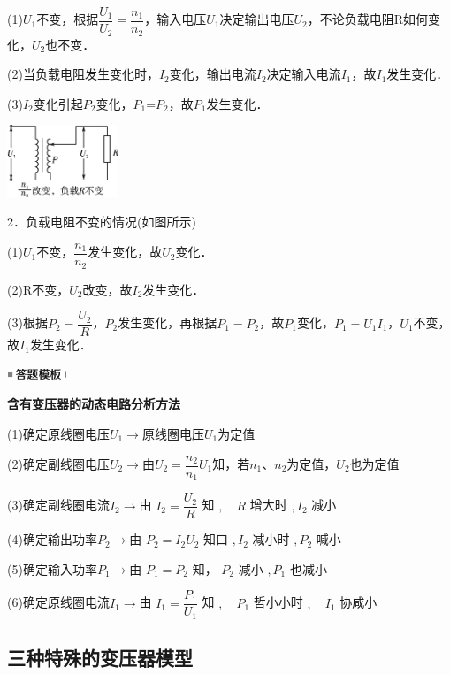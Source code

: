 (1)$U_1$不变，根据$\dfrac{U_{1}}{U_{2}}=\dfrac{n_{1}}{n_{2}}$，输入电压$U_1$决定输出电压$U_2$，不论负载电阻R如何变化，$U_2$也不变．

(2)当负载电阻发生变化时，$I_2$变化，输出电流$I_2$决定输入电流$I_1$，故$I_1$发生变化．

(3)$I_2$变化引起$P_2$变化，$P_1$=$P_2$，故$P_1$发生变化．

\begin{center}\includegraphics[width=1.31111in,height=0.84931in]{media/image453.png}\end{center}

2．负载电阻不变的情况(如图所示)

(1)$U_1$不变，$\dfrac{n_{1}}{n_{2}}$发生变化，故$U_2$变化．

(2)R不变，$U_2$改变，故$I_2$发生变化．

(3)根据$P_{2}=\dfrac{U_{2}}{R}$，$P_2$发生变化，再根据$P_1=P_2$，故$P_1$变化，$P_1=U_1I_1$，$U_1$不变，故$I_1$发生变化．

\begin{center}\includegraphics[width=0.70764in,height=0.12292in]{media/image25.png}\end{center}
\begin{center}
	\textbf{含有变压器的动态电路分析方法}
\end{center}

(1)确定原线圈电压$U_1$$\rightarrow$原线圈电压$U_1$为定值

(2)确定副线圈电压$U_2$$\rightarrow$由$U_{2}=\dfrac{n_{2}}{n_{1}} U_{1}$知，若$n_1$、$n_2$为定值，$U_2$也为定值

(3)确定副线圈电流$I_2$$\rightarrow$由 $I_{2}=\dfrac{U_{2}}{R}$ 知 $, \quad R$ 增大时 $, I_{2}$ 减小

(4)确定输出功率$P_2$$\rightarrow$由 $P_{2}=I_{2} U_{2}$ 知口 $, I_{2}$ 减小时 $, P_{2}$ 喊小

(5)确定输入功率$P_1$$\rightarrow$由 $P_{1}=P_{2}$ 知， $P_{2}$ 减小 $, P_{1}$ 也减小

(6)确定原线圈电流$I_1$$\rightarrow$由 $I_{1}=\dfrac{P_{1}}{U_{1}}$ 知 $, \quad P_{1}$ 哲小小时 $, \quad I_{1}$ 协咸小


\newpage
\subsection{三种特殊的变压器模型}

